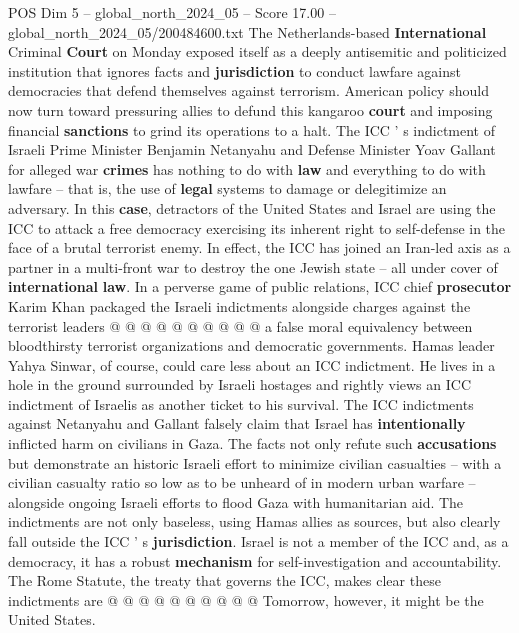 \begin{textsample}{POS Dim 5 – global\_north\_2024\_05 – Score 17.00 – global\_north\_2024\_05/200484600.txt}  \label{ex:f5_pos_175}
The Netherlands-based \textbf{International} Criminal \textbf{Court} on Monday exposed itself as a deeply antisemitic and politicized institution that ignores facts and \textbf{jurisdiction} to conduct lawfare against democracies that defend themselves against terrorism.
American policy should now turn toward pressuring allies to defund this kangaroo \textbf{court} and imposing financial \textbf{sanctions} to grind its operations to a halt.
The ICC ' s indictment of Israeli Prime Minister Benjamin Netanyahu and Defense Minister Yoav Gallant for alleged war \textbf{crimes} has nothing to do with \textbf{law} and everything to do with lawfare -- that is, the use of \textbf{legal} systems to damage or delegitimize an adversary.
In this \textbf{case}, detractors of the United States and Israel are using the ICC to attack a free democracy exercising its inherent right to self-defense in the face of a brutal terrorist enemy.
In effect, the ICC has joined an Iran-led axis as a partner in a multi-front war to destroy the one Jewish state -- all under cover of \textbf{international} \textbf{law}.
In a perverse game of public relations, ICC chief \textbf{prosecutor} Karim Khan packaged the Israeli indictments alongside charges against the terrorist leaders @ @ @ @ @ @ @ @ @ @ a false moral equivalency between bloodthirsty terrorist organizations and democratic governments.
Hamas leader Yahya Sinwar, of course, could care less about an ICC indictment.
He lives in a hole in the ground surrounded by Israeli hostages and rightly views an ICC indictment of Israelis as another ticket to his survival.
The ICC indictments against Netanyahu and Gallant falsely claim that Israel has \textbf{intentionally} inflicted harm on civilians in Gaza.
The facts not only refute such \textbf{accusations} but demonstrate an historic Israeli effort to minimize civilian casualties -- with a civilian casualty ratio so low as to be unheard of in modern urban warfare -- alongside ongoing Israeli efforts to flood Gaza with humanitarian aid.
The indictments are not only baseless, using Hamas allies as sources, but also clearly fall outside the ICC ' s \textbf{jurisdiction}.
Israel is not a member of the ICC and, as a democracy, it has a robust \textbf{mechanism} for self-investigation and accountability.
The Rome Statute, the treaty that governs the ICC, makes clear these indictments are @ @ @ @ @ @ @ @ @ @ Tomorrow, however, it might be the United States.

\end{textsample}
